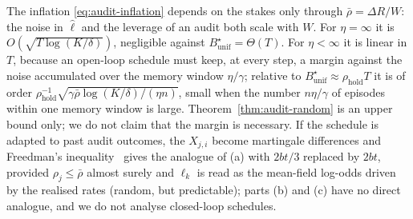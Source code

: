 \begin{remark}\label{rem:audit-random}
The inflation \eqref{eq:audit-inflation} depends on the stakes only through
$\bar\rho=\Delta R/W$: the noise in $\hat\ell$ and the leverage of an audit both
scale with $W$. For $\eta=\infty$ it is $O(\sqrt{T\log(K/\delta)})$, negligible
against $B^\star_{\mathrm{unif}}=\Theta(T)$. For $\eta<\infty$ it is linear in
$T$, because an open-loop schedule must keep, at every step, a margin against
the noise accumulated over the memory window $\eta/\gamma$; relative to
$B^\star_{\mathrm{unif}}\approx\rho_{\mathrm{hold}}T$ it is of order
$\rho_{\mathrm{hold}}^{-1}\sqrt{\gamma\bar\rho\log(K/\delta)/(\eta n)}$, small
when the number $n\eta/\gamma$ of episodes within one memory window is large.
Theorem~\ref{thm:audit-random} is an upper bound only; we do not claim that the
margin is necessary. If the schedule is adapted to past audit outcomes, the
$X_{j,i}$ become martingale differences and Freedman's
inequality~\cite{freedman1975tail} gives the analogue of (a) with $2bt/3$ replaced by $2bt$, provided $\rho_j\le\bar\rho$ almost surely and $\ell_k$ is read as the mean-field log-odds driven by the realised rates (random, but predictable); parts (b) and (c) have no direct analogue, and we do not analyse closed-loop schedules.
\end{remark}
